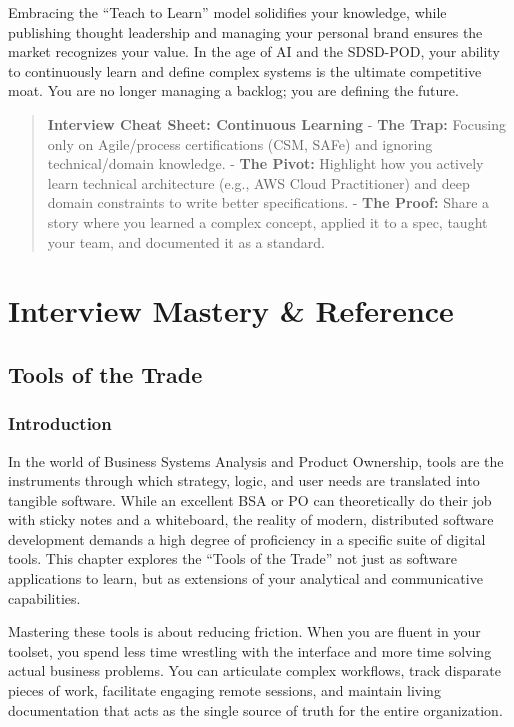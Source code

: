 Embracing the ``Teach to Learn'' model solidifies your knowledge, while
publishing thought leadership and managing your personal brand ensures
the market recognizes your value. In the age of AI and the SDSD-POD,
your ability to continuously learn and define complex systems is the
ultimate competitive moat. You are no longer managing a backlog; you are
defining the future.

\begin{quote}
\textbf{Interview Cheat Sheet: Continuous Learning} - \textbf{The Trap:}
Focusing only on Agile/process certifications (CSM, SAFe) and ignoring
technical/domain knowledge. - \textbf{The Pivot:} Highlight how you
actively learn technical architecture (e.g., AWS Cloud Practitioner) and
deep domain constraints to write better specifications. - \textbf{The
Proof:} Share a story where you learned a complex concept, applied it to
a spec, taught your team, and documented it as a standard.
\end{quote}

\part{Interview Mastery \& Reference}

\chapter{Tools of the Trade}\label{tools-of-the-trade}

\section{Introduction}\label{introduction-2}

In the world of Business Systems Analysis and Product Ownership, tools
are the instruments through which strategy, logic, and user needs are
translated into tangible software. While an excellent BSA or PO can
theoretically do their job with sticky notes and a whiteboard, the
reality of modern, distributed software development demands a high
degree of proficiency in a specific suite of digital tools. This chapter
explores the ``Tools of the Trade'' not just as software applications to
learn, but as extensions of your analytical and communicative
capabilities.

Mastering these tools is about reducing friction. When you are fluent in
your toolset, you spend less time wrestling with the interface and more
time solving actual business problems. You can articulate complex
workflows, track disparate pieces of work, facilitate engaging remote
sessions, and maintain living documentation that acts as the single
source of truth for the entire organization.

